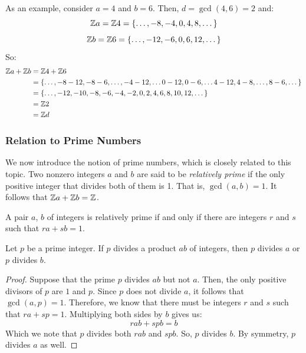 \documentclass[letterpaper]{article}
\begin{document}
As an example, consider $a = 4$ and $b = 6$. Then, $d = \gcd(4, 6) = 2$ and: 
\[\mathbb{Z} a = \mathbb{Z} 4 = \{\dots, -8, -4, 0, 4, 8, \dots\}\]
\[\mathbb{Z} b = \mathbb{Z} 6 = \{\dots, -12, -6, 0, 6, 12, \dots\}\]
So: 
\begin{equation*}
    \begin{aligned}
        \mathbb{Z} a + \mathbb{Z} b &= \mathbb{Z} 4 + \mathbb{Z} 6 \\ 
                &= \{\dots, -8 - 12, -8 - 6, \dots, -4 - 12, \dots 0 - 12, 0 - 6, \dots 4 - 12, 4 - 8, \dots, 8 - 6, \dots\} \\ 
                &= \{\dots, -12, -10, -8, -6, -4, -2, 0, 2, 4, 6, 8, 10, 12, \dots\} \\ 
                &= \mathbb{Z} 2 \\ 
                &= \mathbb{Z} d
    \end{aligned}
\end{equation*}


\subsubsection{Relation to Prime Numbers}
We now introduce the notion of prime numbers, which is closely related to this topic. Two nonzero integers $a$ and $b$ are said to be \emph{relatively prime} if the only positive integer that divides both of them is 1. That is, $\gcd(a, b) = 1$. It follows that $\mathbb{Z} a + \mathbb{Z} b = \mathbb{Z}$. 
\begin{corollary}{}{}
    A pair $a$, $b$ of integers is relatively prime if and only if there are integers $r$ and $s$ such that $ra + sb = 1$.
\end{corollary}

\begin{corollary}{}{}
    Let $p$ be a prime integer. If $p$ divides a product $ab$ of integers, then $p$ divides $a$ or $p$ divides $b$. 
\end{corollary}

\begin{mdframed}
    \begin{proof}
        Suppose that the prime $p$ divides $ab$ but not $a$. Then, the only positive divisors of $p$ are $1$ and $p$. Since $p$ does not divide $a$, it follows that $\gcd(a, p) = 1$. Therefore, we know that there must be integers $r$ and $s$ such that $ra + sp = 1$. Multiplying both sides by $b$ gives us: 
        \[rab + spb = b\]
        Which we note that $p$ divides both $rab$ and $spb$. So, $p$ divides $b$. By symmetry, $p$ divides $a$ as well. 
    \end{proof}
\end{mdframed}
\end{document}
